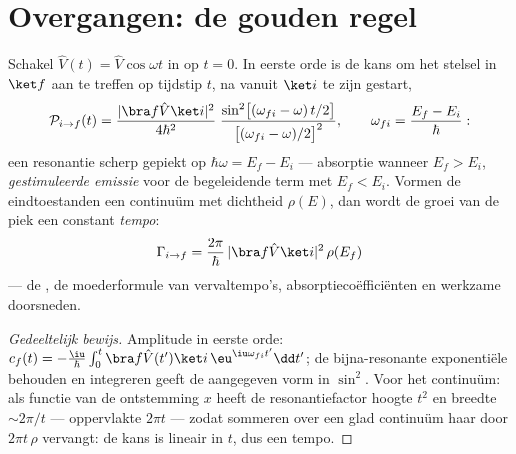 \section{Overgangen: de gouden regel}

\begin{theorem}\label{thm:b3:perturbation-theory:golden}
Schakel $\hat V(t) = \hat V\cos\omega t$ in op $t = 0$. In eerste orde is
de kans om het stelsel in $\ket f$ aan te treffen op tijdstip $t$, na
vanuit $\ket i$ te zijn gestart,
\[
\mathcal P_{i\to f}(t) = \frac{|\bra f\hat V\ket i|^2}{4\hbar^2}\;
\frac{\sin^2\!\big[(\omega_{fi} - \omega)\,t/2\big]}
{\big[(\omega_{fi} - \omega)/2\big]^2} ,
\qquad \omega_{fi} = \frac{E_f - E_i}{\hbar} :
\]
een resonantie scherp gepiekt op $\hbar\omega = E_f - E_i$ ---
absorptie wanneer $E_f > E_i$, \emph{gestimuleerde emissie} voor de
begeleidende term met $E_f < E_i$. Vormen de eindtoestanden een continuüm
met dichtheid $\rho(E)$, dan wordt de groei van de piek een constant
\emph{tempo}:
\[
\Gamma_{i\to f} = \frac{2\pi}{\hbar}\,
|\bra f\hat V\ket i|^2\,\rho(E_f)
\]
--- de \emph{}, de moederformule van
vervaltempo's, absorptiecoëfficiënten en werkzame doorsneden.
\end{theorem}

\begin{proof}[Gedeeltelijk bewijs]
Amplitude in eerste orde: $c_f(t) = -\tfrac{\iu}{\hbar}\int_0^t\bra
f\hat V(t')\ket i\,\eu^{\iu\omega_{fi}t'}\dd t'$; de bijna-resonante
exponentiële behouden en integreren geeft de aangegeven vorm in
$\sin^2$. Voor het continuüm: als functie van de ontstemming $x$ heeft de
resonantiefactor hoogte $t^2$ en breedte $\sim 2\pi/t$ --- oppervlakte
$2\pi t$ --- zodat sommeren over een glad continuüm haar door
$2\pi t\,\rho$ vervangt: de kans is lineair in $t$, dus een tempo.
\end{proof}

